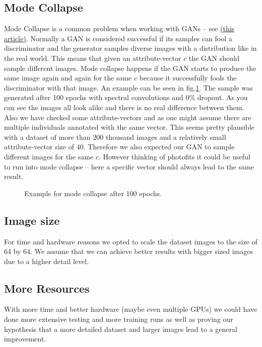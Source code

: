 \documentclass[12pt, a4paper]{article}
\begin{document}
\subsection{Mode Collapse}
Mode Collapse is a common problem when working with GANs -- see \href{https://machinelearning.wtf/terms/mode-collapse/}{(this article)}.
Normally a GAN is considered successful if its samples can fool a discriminator and the generator samples diverse images with a distribution like in the real world. 
This means that given an attribute-vector $c$ the GAN should sample different images. Mode collapse happens if the GAN starts to produce the same image again and again for the same $c$
because it successfully fools the discriminator with that image. An example can be seen in fig.\ref{fig:modecollapse}.
The sample was generated after 100 epochs with spectral convolutions and 0\% dropout. As you can see the images all look alike and there is no real difference between them. Also we have checked some attribute-vectors
and as one might assume there are multiple individuals annotated with the same vector. This seems pretty plausible with a dataset of more than 200 thousand images and a relatively small attribute-vector size of 40. Therefore 
we also expected our GAN to sample different images for the same $c$. However thinking of photofits it could be useful to run into mode collapse -- here a specific vector should always lead to the same result.
\begin{figure}
    \caption{Example for mode collapse after 100 epochs.}
    \label{fig:modecollapse}
\end{figure}
\subsection{Image size}
For time and hardware reasons we opted to scale the dataset images to the size of 64 by 64.
We assume that we can achieve better results with bigger sized images due to a higher detail level.

\subsection{More Resources}
With more time and better hardware (maybe even multiple GPUs) we could have done more extensive testing and more training runs
as well as proving our hypothesis that a more detailed dataset and larger images lead to a general improvement.
\end{document}
